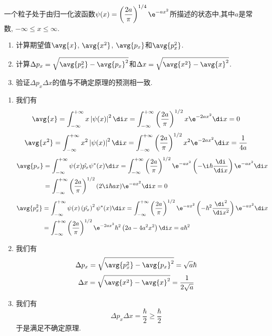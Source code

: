 \documentclass{ctexart}
\begin{document}
\begin{homework}[12.]
    一个粒子处于由归一化波函数$\psi(x)=\left(\dfrac{2a}{\pi}\right)^{1/4}\e^{-ax^2}$所描述的状态中,其中$a$是常数, $-\infty\leq x\leq\infty$.
    \begin{enumerate}[label=(\alph*)]
        \item 计算期望值$\avg{x}$, $\avg{x^2}$, $\avg{p_x}$和$\avg{p_x^2}$.
        \item 计算$\Delta p_x=\sqrt{\avg{p_x^2}-\avg{p_x}^2}$和$\Delta x=\sqrt{\avg{x^2}-\avg{x}^2}$.
        \item 验证$\Delta p_x\Delta x$的值与不确定原理的预测相一致.
    \end{enumerate}
\end{homework}
\begin{solution}
    \begin{enumerate}[label=(\alph*)]
        \item 我们有
        \[\avg{x}=\int_{-\infty}^{+\infty}x\left|\psi(x)\right|^2\di x=\int_{-\infty}^{+\infty}\left(\dfrac{2a}{\pi}\right)^{1/2}x\e^{-2ax^2}\di x=0\]
        \[\avg{x^2}=\int_{-\infty}^{+\infty}x^2\left|\psi(x)\right|^2\di x=\int_{-\infty}^{+\infty}\left(\dfrac{2a}{\pi}\right)^{1/2}x^2\e^{-2ax^2}\di x=\dfrac{1}{4a}\]
        \[\begin{aligned}
            \avg{p_x}
            &=\int_{-\infty}^{+\infty}\psi(x)\hat{p_x}\psi^\ast(x)\di x=\int_{-\infty}^{+\infty}\left(\dfrac{2a}{\pi}\right)^{1/2}\e^{-ax^2}\left(-\i\hbar\dfrac{\di}{\di x}\right)\e^{-ax^2}\di x\\
            &=\int_{-\infty}^{+\infty}\left(\dfrac{2a}{\pi}\right)^{1/2}(2\i\hbar ax)\e^{-ax^2}\di x=0
        \end{aligned}\]
        \[\begin{aligned}
            \avg{p_x^2}
            &=\int_{-\infty}^{+\infty}\psi(x)\left(\hat{p_x}\right)^2\psi^\ast(x)\di x=\int_{-\infty}^{+\infty}\left(\dfrac{2a}{\pi}\right)^{1/2}\e^{-ax^2}\left(-\hbar^2\dfrac{\di^2}{\di x^2}\right)\e^{-ax^2}\di x\\
            &=\int_{-\infty}^{+\infty}\left(\dfrac{2a}{\pi}\right)^{1/2}\e^{-2ax^2}\hbar^2\left(2a-4a^2x^2\right)\di x=a\hbar^2
        \end{aligned}\]
        \item 我们有
        \[\Delta p_x=\sqrt{\avg{p_x^2}-\avg{p_x}^2}=\sqrt{a}\hbar\]
        \[\Delta x=\sqrt{\avg{x^2}-\avg{x}^2}=\dfrac{1}{2\sqrt{a}}\]
        \item 我们有
        \[\Delta p_x\Delta x=\dfrac{\hbar}{2}\geq\dfrac{\hbar}{2}\]
        于是满足不确定原理.
    \end{enumerate}
\end{solution}
\end{document}
